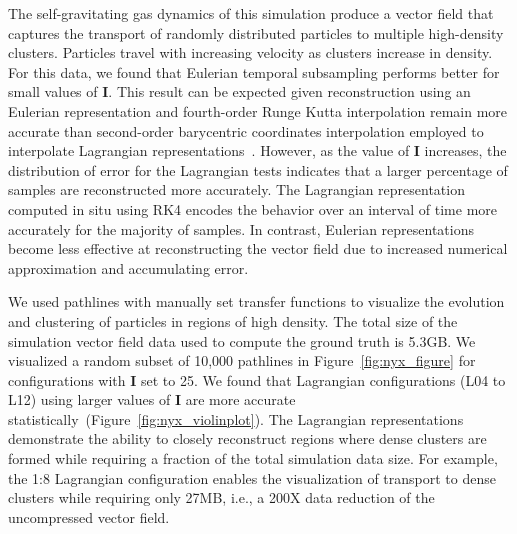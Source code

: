 The self-gravitating gas dynamics of this simulation produce a vector field that captures the transport of randomly distributed particles to multiple high-density clusters.
%
Particles travel with increasing velocity as clusters increase in density.
%
For this data, we found that Eulerian temporal subsampling performs better for small values of \textbf{I}.
%
This result can be expected given reconstruction using an Eulerian representation and fourth-order Runge Kutta interpolation remain more accurate than second-order barycentric coordinates interpolation employed to interpolate Lagrangian representations~\cite{bujack2015lagrangian}\cite{hummel2016error}.
%
%
However, as the value of \textbf{I} increases, the distribution of error for the Lagrangian tests indicates that a larger percentage of samples are reconstructed more accurately.
%
The Lagrangian representation computed in situ using RK4 encodes the behavior over an interval of time more accurately for the majority of samples.
%
In contrast, Eulerian representations become less effective at reconstructing the vector field due to increased numerical approximation and accumulating error.
%
%
%

We used pathlines with manually set transfer functions to visualize the evolution and clustering of particles in regions of high density.
%
The total size of the simulation vector field data used to compute the ground truth is 5.3GB.
%
We visualized a random subset of 10,000 pathlines in Figure~\ref{fig:nyx_figure} for configurations with \textbf{I} set to 25.
%
We found that Lagrangian configurations (L04 to L12) using larger values of \textbf{I} are more accurate statistically~(Figure~\ref{fig:nyx_violinplot}).
%
%
The Lagrangian representations demonstrate the ability to closely reconstruct regions where dense clusters are formed while requiring a fraction of the total simulation data size.
%
For example, the 1:8 Lagrangian configuration enables the visualization of transport to dense clusters while requiring only 27MB, i.e., a 200X data reduction of the uncompressed vector field.
%

